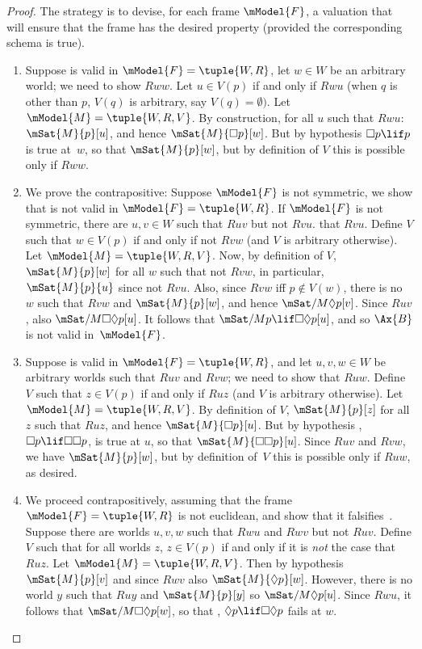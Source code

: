 \documentclass[../../../include/open-logic-section]{subfiles}
\begin{document}
\begin{proof}
  The strategy is to devise, for each frame $\mModel{F}$, a valuation
  that will ensure that the frame has the desired property (provided
  the corresponding schema is true).
  \begin{enumerate}
  \item Suppose  is valid in $\mModel{F} =\tuple{W, R}$, let $w
    \in W$ be an arbitrary world; we need to show $Rww$. Let $u \in
    V(p)$ if and only if $Rwu$ (when $q$ is other than $p$, $V(q)$ is
    arbitrary, say $V(q) = \emptyset)$. Let $\mModel{M}=\tuple{W, R,
      V}$. By construction, for all $u$ such that $Rwu$:
    $\mSat{M}{p}[u]$, and hence $\mSat{M}{\Box p}[w]$. But by
    hypothesis $\Box p \lif p$ is true at~$w$, so that
    $\mSat{M}{p}[w]$, but by definition of $V$ this is possible only
    if $Rww$.
  \item We prove the contrapositive: Suppose $\mModel{F}$ is not
    symmetric, we show that  is not valid in $\mModel{F}=
    \tuple{W,R}$. If $\mModel{F}$ is not symmetric, there are $u,v \in
    W$ such that $Ruv$ but not $Rvu$.  that $Rvu$. Define $V$ such
    that $w \in V(p)$ if and only if not $Rvw$ (and $V$ is arbitrary
    otherwise). Let $\mModel{M} =\tuple{W, R, V}$.  Now, by definition
    of $V$, $\mSat{M}{p}[w]$ for all $w$ such that not $Rvw$, in
    particular, $\mSat{M}{p}{u}$ since not $Rvu$. Also, since $Rvw$
    iff $p \notin V(w)$, there is no $w$ such that $Rvw$ and
    $\mSat{M}{p}[w]$, and hence $\mSat/{M}{\Diamond p}[v]$. Since
    $Ruv$, also $\mSat/{M}{\Box\Diamond p}[u]$. It follows that
    $\mSat/{M}{p \lif \Box\Diamond p}[u]$, and so $\Ax{B}$ is not valid
    in~$\mModel{F}$.
  \item Suppose  is valid in $\mModel{F} = \tuple{W,R}$, and let
    $u,v,w \in W$ be arbitrary worlds such that $Ruv$ and $Rvw$; we
    need to show that $Ruw$. Define $V$ such that $z \in V(p)$ if and
    only if $Ruz$ (and $V$ is arbitrary otherwise). Let $\mModel{M}
    =\tuple{W, R, V}$. By definition of $V$, $\mSat{M}{p}[z]$ for all
    $z$ such that $Ruz$, and hence $\mSat{M}{\Box p}[u]$. But by
    hypothesis , $\Box p \lif \Box \Box p$, is true at $u$, so
    that $\mSat{M}{\Box \Box p}[u]$. Since $Ruv$ and $Rvw$, we have
    $\mSat{M}{p}[w]$, but by definition of~$V$ this is possible only
    if $Ruw$, as desired.
  \item We proceed contrapositively, assuming that the frame
    $\mModel{F} = \tuple{W, R}$ is not euclidean, and show that it
    falsifies~. Suppose there are worlds $u, v, w$ such that
    $Rwu$ and $Rwv$ but not $Ruv$. Define $V$ such that for all worlds
    $z$, $z \in V(p)$ if and only if it is \emph{not} the case
    that~$Ruz$. Let $\mModel{M} =\tuple{W, R, V}$. Then by hypothesis
    $\mSat{M}{p}[v]$ and since $Rwv$ also $\mSat{M}{\Diamond
      p}[w]$. However, there is no world $y$ such that $Ruy$ and
    $\mSat{M}{p}[y]$ so $\mSat/{M}{\Diamond p}[u]$. Since $Rwu$,
    it follows that $\mSat/{M}{\Box\Diamond p}[w]$, so that 
    , $\Diamond p \lif \Box\Diamond p$ fails at $w$.
  \end{enumerate}
\end{proof}
\end{document}
